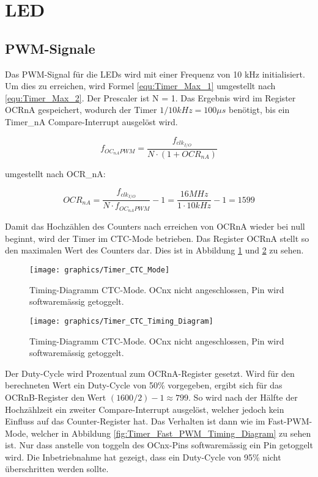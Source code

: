 \section{LED}
\subsection{PWM-Signale}\label{Appendix:Timer_PWM}

Das PWM-Signal für die LEDs wird mit einer Frequenz von 10 kHz initialisiert. Um dies zu erreichen, wird Formel \ref{equ:Timer_Max_1} umgestellt nach \ref{equ:Timer_Max_2}. Der Prescaler ist N = 1. Das Ergebnis wird im Register OCRnA gespeichert, wodurch der Timer $1/10kHz = 100\mu s$ benötigt, bis ein Timer\_nA Compare-Interrupt ausgelöst wird. \cite[S.148]{atmel_atmel_2014}

\begin{equation}
f_{OC_{nA}PWM} = \frac{f_{clk_{I/O}}}{N \cdot (1+OCR_{nA})}
\label{equ:Timer_Max_1}
\end{equation}

umgestellt nach OCR\_nA:

\begin{equation}
OCR_{nA} = \frac{f_{clk_{I/O}}}{N \cdot f_{OC_{nA}PWM}} - 1 = \frac{16MHz}{1 \cdot 10kHz} - 1 = 1599
\label{equ:Timer_Max_2}
\end{equation}

Damit das Hochzählen des Counters nach erreichen von OCRnA wieder bei null beginnt, wird der Timer im CTC-Mode betrieben. Das Register OCRnA stellt so den maximalen Wert des Counters dar. Dies ist in Abbildung \ref {fig:Timer_CTC_Mode} und \ref{fig:Timer_CTC_Timing_Diagram} zu sehen.

\begin{figure}[H]
	\centering
	\texttt{[image: graphics/Timer\_CTC\_Mode]}
	\caption{Timing-Diagramm CTC-Mode. OCnx nicht angeschlossen, Pin wird softwaremässig getoggelt.\cite[S.145]{atmel_atmel_2014}}
	\label{fig:Timer_CTC_Mode}
\end{figure}

\begin{figure}[H]
	\centering
	\texttt{[image: graphics/Timer\_CTC\_Timing\_Diagram]}
	\caption{Timing-Diagramm CTC-Mode. OCnx nicht angeschlossen, Pin wird softwaremässig getoggelt.\cite[S.146]{atmel_atmel_2014}}
	\label{fig:Timer_CTC_Timing_Diagram}
\end{figure}

Der Duty-Cycle wird Prozentual zum OCRnA-Register gesetzt. Wird für den berechneten Wert ein Duty-Cycle von 50\% vorgegeben, ergibt sich für das OCRnB-Register den Wert $(1600 / 2) -1 \approx 799$. So wird nach der Hälfte der Hochzählzeit ein zweiter Compare-Interrupt ausgelöst, welcher jedoch kein Einfluss auf das Counter-Register hat. Das Verhalten ist dann wie im Fast-PWM-Mode, welcher in Abbildung \ref{fig:Timer_Fast_PWM_Timing_Diagram} zu sehen ist. Nur dass anstelle von toggeln des OCnx-Pins softwaremässig ein Pin getoggelt wird. Die Inbetriebnahme hat gezeigt, dass ein Duty-Cycle von 95\% nicht überschritten werden sollte.

